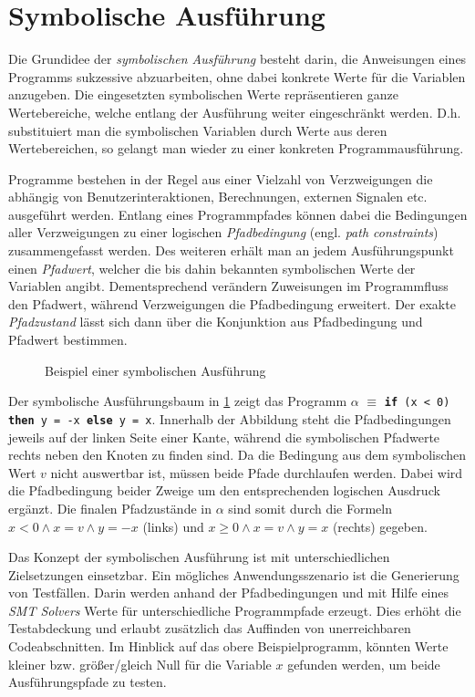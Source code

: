 \section{Symbolische Ausführung}

Die Grundidee der \emph{symbolischen Ausführung} besteht darin, die Anweisungen eines Programms sukzessive abzuarbeiten, ohne dabei konkrete Werte für die Variablen anzugeben. Die eingesetzten symbolischen Werte repräsentieren ganze Wertebereiche, welche entlang der Ausführung weiter eingeschränkt werden. D.h. substituiert man die symbolischen Variablen durch Werte aus deren Wertebereichen, so gelangt man wieder zu einer konkreten Programmausführung.

Programme bestehen in der Regel aus einer Vielzahl von Verzweigungen die abhängig von Benutzerinteraktionen, Berechnungen, externen Signalen etc. ausgeführt werden. Entlang eines Programmpfades können dabei die Bedingungen aller Verzweigungen zu einer logischen \emph{Pfadbedingung} (engl. \emph{path constraints}) zusammengefasst werden. Des weiteren erhält man an jedem Ausführungspunkt einen \emph{Pfadwert}, welcher die bis dahin bekannten symbolischen Werte der Variablen angibt. Dementsprechend verändern Zuweisungen im Programmfluss den Pfadwert, während Verzweigungen die Pfadbedingung erweitert. Der exakte \emph{Pfadzustand} lässt sich dann über die Konjunktion aus Pfadbedingung und Pfadwert bestimmen. \cite{Kneuper2008}

\begin{figure}[!hbt]
	\centering
	
	\caption{Beispiel einer symbolischen Ausführung}
	\label{fig:tree}
\end{figure}

\noindent
Der symbolische Ausführungsbaum in \cref{fig:tree} zeigt das Programm $\alpha$ $\equiv$ \texttt{\textbf{if} (x < 0) \textbf{then} y = -x \textbf{else} y = x}. Innerhalb der Abbildung steht die Pfadbedingungen jeweils auf der linken Seite einer Kante, während die symbolischen Pfadwerte rechts neben den Knoten zu finden sind. Da die Bedingung aus dem symbolischen Wert $v$ nicht auswertbar ist, müssen beide Pfade durchlaufen werden. Dabei wird die Pfadbedingung beider Zweige um den entsprechenden logischen Ausdruck ergänzt. Die finalen Pfadzustände in $\alpha$ sind somit durch die Formeln $x < 0 \wedge x = v \wedge y = -x$ (links) und $x \geq 0 \wedge x = v \wedge y = x$ (rechts) gegeben.

Das Konzept der symbolischen Ausführung ist mit unterschiedlichen Zielsetzungen einsetzbar. Ein mögliches Anwendungsszenario ist die Generierung von Testfällen. Darin werden anhand der Pfadbedingungen und mit Hilfe eines \emph{SMT Solvers} Werte für unterschiedliche Programmpfade erzeugt. Dies erhöht die Testabdeckung und erlaubt zusätzlich das Auffinden von unerreichbaren Codeabschnitten. Im Hinblick auf das obere Beispielprogramm, könnten Werte kleiner bzw. größer/gleich Null für die Variable $x$ gefunden werden, um beide Ausführungspfade zu testen.


